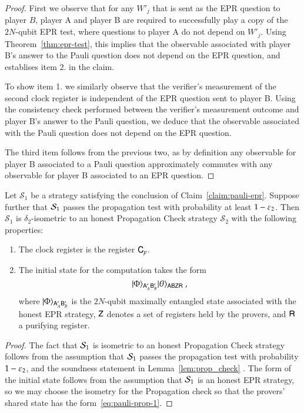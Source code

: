 \begin{proof}
First we observe that for any $W'_j$ that is sent as the EPR question to player $B$, player A and player B are required to successfully play a copy of the $2N$-qubit EPR test, where questions to player A do not depend on $W'_j$. Using Theorem~\ref{thm:epr-test}, this implies that the observable associated with player B's answer to the Pauli question does not depend on the EPR question, and establises item 2. in the claim. 

To show item 1. we similarly observe that the verifier's measurement of the second clock register is independent of the EPR question sent to player B. Using the consistency check performed between the verifier's measurement outcome and player B's answer to the Pauli question, we deduce that the observable associated with the Pauli question does not depend on the EPR question. 

The third item follows from the previous two, as by definition any observable for player B associated to a Pauli question approximately commutes with any observable for player B associated to an EPR question. 

\end{proof}

\begin{claim}\label{claim:pauli-propagation}
Let $\mathcal{S}_1$ be a strategy satisfying the conclusion of Claim~\ref{claim:pauli-epr}. Suppose further that $\mathcal{S}_1$ passes the propagation test with probability at least $1-\varepsilon_2$. Then $\mathcal{S}_1$ is $\delta_2$-isometric to an honest Propagation Check strategy $\mathcal{S}_2$ with the following properties:
\begin{enumerate}
\item The clock register is the register ${\mathsf{C}}_p$. 
\item The initial state for the computation takes the form 
\begin{equation}\label{eq:pauli-prop-1}
\ket{\Phi}_{\sA'_A\sB'_B} \ket{\theta}_{\sA\sB\sZ\sR}\;,
\end{equation}
where $|\Phi\rangle_{{\mathsf{A}}'_A{\mathsf{B}}'_B}$ is the $2N$-qubit maximally entangled state associated with the honest EPR strategy, ${\mathsf{Z}}$ denotes a set of registers held by the provers, and ${\mathsf{R}}$ a purifying register.
\end{enumerate}
\end{claim}

\begin{proof}
The fact that $\mathcal{S}_1$ is isometric to an honest Propagation Check strategy follows from the assumption that  $\mathcal{S}_1$ passes the propagation test with probability $1-\varepsilon_2$, and the soundness statement in Lemma~\ref{lem:prop_check} . The form of the initial state follows from the assumption that $\mathcal{S}_1$ is an honest EPR strategy, so we may choose the isometry for the Propagation check so that the provers' shared state has the form~\eqref{eq:pauli-prop-1}. 
\end{proof}


